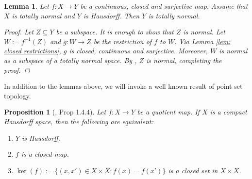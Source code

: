 \documentclass[11pt, twoside]{amsart}
\newtheorem{prop}[thm]{Proposition}
\newtheorem{lemma}[thm]{Lemma}
\theoremstyle{definition}
\begin{document}
\begin{lemma}\label{lemma:topology_lemma}
  Let $f:X\to Y$ be a continuous, closed and surjective map. Assume that $X$ is totally normal and $Y$ is Hausdorff. Then $Y$ is totally normal.
  \begin{proof}
    Let $Z\subseteq Y$ be a subspace. It is enough to show that $Z$ is normal. Let $W:=f^{-1}(Z)$ and $g:W\rightarrow Z$ be the restriction of $f$ to $W$. Via Lemma \ref{lem: closed restrictions}, $g$ is closed, continuous and surjective. Moreover, $W$ is normal as a subspace of a totally normal space. By \cite[Ex. 6, Section 31]{Munkres_topology}, $Z$ is normal, completing the proof.
  \end{proof}
\end{lemma}

In addition to the lemmas above, we will invoke a well known result of point set topology.

\begin{prop}[\cite{dieck08}, Prop 1.4.4]\label{prop:hausdorff_closed}
Let $f:X\rightarrow Y$ be a quotient map. If $X$ is a compact Hausdorff space, then the following are equivalent:
\begin{enumerate}[label=(\roman*)]
\item $Y$ is Hausdorff.
\item $f$ is a closed map.
\item $\ker(f):=\{(x,x')\in X\times X: f(x)=f(x')\}$ is a closed set in $X\times X$.
\end{enumerate}
\end{prop}
\end{document}
